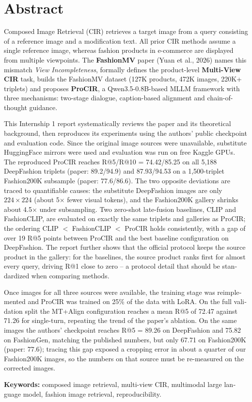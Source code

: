 \chapter*{Abstract}
\onehalfspacing
\vspace{1.0cm}

\begin{otherlanguage}{english}
Composed Image Retrieval (CIR) retrieves a target image from a query consisting of a reference image and a modification text. All prior CIR methods assume a single reference image, whereas fashion products in e-commerce are displayed from multiple viewpoints. The \textbf{FashionMV} paper (Yuan et al., 2026) names this mismatch \emph{View Incompleteness}, formally defines the product-level \textbf{Multi-View CIR} task, builds the FashionMV dataset (127K products, 472K images, 220K+ triplets) and proposes \textbf{ProCIR}, a Qwen3.5-0.8B-based MLLM framework with three mechanisms: two-stage dialogue, caption-based alignment and chain-of-thought guidance.

This Internship 1 report systematically reviews the paper and its theoretical background, then reproduces its experiments using the authors' public checkpoint and evaluation code. Since the original image sources were unavailable, substitute HuggingFace mirrors were used and evaluation was run on free Kaggle GPUs. The reproduced ProCIR reaches R@5/R@10 = 74.42/85.25 on all 5,188 DeepFashion triplets (paper: 89.2/94.9) and 87.93/94.53 on a 1,500-triplet Fashion200K subsample (paper: 77.6/86.6). The two opposite deviations are traced to quantifiable causes: the substitute DeepFashion images are only $224 \times 224$ (about 5$\times$ fewer visual tokens), and the Fashion200K gallery shrinks about 4.5$\times$ under subsampling. Two zero-shot late-fusion baselines, CLIP and FashionCLIP, are evaluated on exactly the same triplets and galleries as ProCIR; the ordering CLIP $<$ FashionCLIP $<$ ProCIR holds consistently, with a gap of over 19 R@5 points between ProCIR and the best baseline configuration on DeepFashion. The report further shows that the official protocol keeps the source product in the gallery: for the baselines, the source product ranks first for almost every query, driving R@1 close to zero -- a protocol detail that should be standardized when comparing methods.

Once images for all three sources were available, the training stage was reimplemented and ProCIR was trained on 25\% of the data with LoRA. On the full validation split the MT+Align configuration reaches a mean R@5 of 72.47 against 71.26 for single-turn, repeating the trend of the paper's ablation. On the same images the authors' checkpoint reaches R@5 = 89.26 on DeepFashion and 75.82 on FashionGen, matching the published numbers, but only 67.71 on Fashion200K (paper: 77.6); tracing this gap exposed a cropping error in about a quarter of our Fashion200K images, so the numbers on that source must be re-measured on the corrected images.

\bigskip
\noindent\textbf{Keywords:} composed image retrieval, multi-view CIR, multimodal large language model, fashion image retrieval, reproducibility.
\end{otherlanguage}
